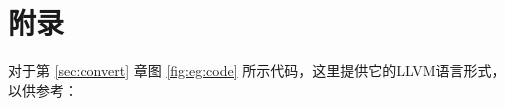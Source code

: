 
\section{附录} \label{sec:append}

对于第 \ref{sec:convert} 章图 \ref{fig:eg:code} 所示代码，这里提供它的LLVM语言形式，以供参考：

{
    
}
